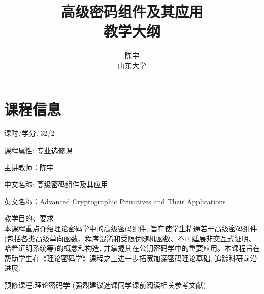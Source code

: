 \documentclass[a4paper,12pt]{ctexart}
\begin{document}
\title{高级密码组件及其应用\\教学大纲}

\author{
    陈宇\\ 
    山东大学\\
}

\date{}

\maketitle

\section*{课程信息}
\begin{trivlist}
\item 课时/学分: 32/2     
\item 课程属性: 专业选修课
\item 主讲教师：陈宇
\item 中文名称: 高级密码组件及其应用
\item 英文名称：Advanced Cryptographic Primitives and Their Applications

\item 教学目的、要求\\ 
    本课程重点介绍理论密码学中的高级密码组件, 
    旨在使学生精通若干高级密码组件(包括各类高级单向函数、程序混淆和受限伪随机函数、不可延展非交互式证明、哈希证明系统等)的概念和构造, 并掌握其在公钥密码学中的重要应用。本课程旨在帮助学生在《理论密码学》课程之上进一步拓宽加深密码理论基础, 追踪科研前沿进展. 

\item 预修课程:理论密码学 (强烈建议选课同学课前阅读相关参考文献)
\end{trivlist}
\end{document}
